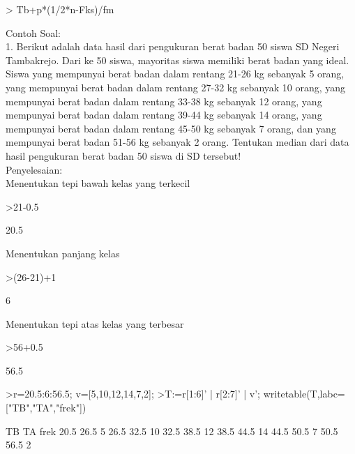 \documentclass[a4paper,10pt]{article}
\begin{document}
\begin{eulernotebook}
\begin{eulercomment}
\textgreater{} Tb+p*(1/2*n-Fks)/fm

Contoh Soal:\\
1. Berikut adalah data hasil dari pengukuran berat badan 50 siswa SD
Negeri Tambakrejo. Dari ke 50 siswa, mayoritas siswa memiliki berat
badan yang ideal. Siswa yang mempunyai berat badan dalam rentang 21-26
kg sebanyak 5 orang, yang mempunyai berat badan dalam rentang 27-32 kg
sebanyak 10 orang, yang mempunyai berat badan dalam rentang 33-38 kg
sebanyak 12 orang, yang mempunyai berat badan dalam rentang 39-44 kg
sebanyak 14 orang, yang mempunyai berat badan dalam rentang 45-50 kg
sebanyak 7 orang, dan yang mempunyai berat badan 51-56 kg sebanyak 2
orang. Tentukan median dari data hasil pengukuran berat badan 50 siswa
di SD tersebut!\\
Penyelesaian:\\
Menentukan tepi bawah kelas yang terkecil
\end{eulercomment}
\begin{eulerprompt}
>21-0.5
\end{eulerprompt}
\begin{euleroutput}
  20.5
\end{euleroutput}
\begin{eulercomment}
Menentukan panjang kelas
\end{eulercomment}
\begin{eulerprompt}
>(26-21)+1
\end{eulerprompt}
\begin{euleroutput}
  6
\end{euleroutput}
\begin{eulercomment}
Menentukan tepi atas kelas yang terbesar
\end{eulercomment}
\begin{eulerprompt}
>56+0.5
\end{eulerprompt}
\begin{euleroutput}
  56.5
\end{euleroutput}
\begin{eulerprompt}
>r=20.5:6:56.5; v=[5,10,12,14,7,2];
>T:=r[1:6]' | r[2:7]' | v'; writetable(T,labc=["TB","TA","frek"])
\end{eulerprompt}
\begin{euleroutput}
          TB        TA      frek
        20.5      26.5         5
        26.5      32.5        10
        32.5      38.5        12
        38.5      44.5        14
        44.5      50.5         7
        50.5      56.5         2
\end{euleroutput}

\end{eulernotebook}
\end{document}
